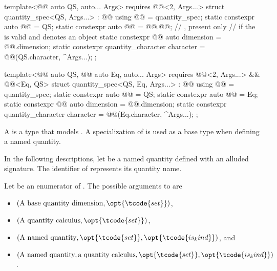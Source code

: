 \begin{codeblock}
{template<@@ auto QS, auto... Args>
  requires @@<2, Args...>
struct quantity_spec<QS, Args...> : @@ {
  using @@ = quantity_spec;
  static constexpr auto @@ = QS;
  static constexpr auto @@ = @@.@@;  // \expos, present only
    // if the   is valid and denotes an object
  static constexpr @@ auto dimension = @@.dimension;
  static constexpr quantity_character character =
    @@(QS.character, {^Args...});
};

template<@@ auto QS, @@ auto Eq, auto... Args>
  requires @@<2, Args...> && @@<Eq, QS>
struct quantity_spec<QS, Eq, Args...> : @@ {
  using @@ = quantity_spec;
  static constexpr auto @@ = QS;
  static constexpr auto @@ = Eq;
  static constexpr @@ auto dimension = @@.dimension;
  static constexpr quantity_character character =
    @@(Eq.character, {^Args...});
};

}
\end{codeblock}

\pnum
A  is a type that models .
A specialization of  is used as a base type when defining a named quantity.

\pnum
In the following descriptions, let  be a named quantity defined with an alluded signature.
The identifier of  represents its quantity name.

\pnum
Let  be an enumerator of .
The possible arguments to  are
\begin{itemize}
\item
$(\text{A base quantity dimension}, \opt{\tcode{set}})$,
\item
$(\text{A quantity calculus}, \opt{\tcode{set}})$,
\item
$(\text{A named quantity}, \opt{\tcode{set}}, \opt{\tcode{is_kind}})$, and
\item
$(\text{A named quantity}, \text{a quantity calculus}, \opt{\tcode{set}}, \opt{\tcode{is_kind}})$.
\end{itemize}

